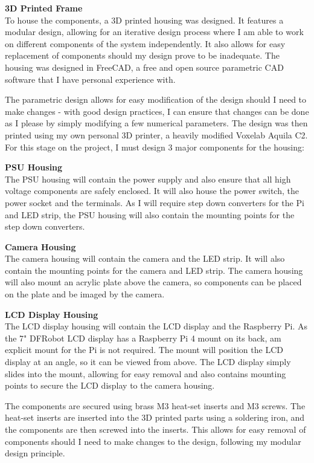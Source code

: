 \vspace{1em}
\noindent
\textbf{3D Printed Frame} \\
To house the components, a 3D printed housing was designed. It features a modular design, allowing for an iterative design process
where I am able to work on different components of the system independently. It also allows for easy replacement of components
should my design prove to be inadequate. The housing was designed in FreeCAD, a free and open source parametric CAD software 
that I have personal experience with.

The parametric design allows for easy modification of the design should I need to make changes -
with good design practices, I can ensure that changes can be done as I please by simply modifying a few numerical parameters.
The design was then printed using my own personal 3D printer, a heavily modified Voxelab Aquila C2. For this stage on the project,
I must design 3 major components for the housing:
\begin{mylist}
  \item \textbf{PSU Housing} \\
  The PSU housing will contain the power supply and also ensure that all high voltage components are safely enclosed.
  It will also house the power switch, the power socket and the terminals. As I will require step down converters for the Pi and LED strip,
  the PSU housing will also contain the mounting points for the step down converters.
  \item \textbf{Camera Housing} \\
  The camera housing will contain the camera and the LED strip. It will also contain the mounting points for the camera and LED strip.
  The camera housing will also mount an acrylic plate above the camera, so components can be placed on the plate and be imaged by the camera.
  \item \textbf{LCD Display Housing} \\
  The LCD display housing will contain the LCD display and the Raspberry Pi. As the 7" DFRobot LCD display has a Raspberry Pi 4 mount on its back,
  am explicit mount for the Pi is not required. The mount will position the LCD display at an angle, so it can be viewed from above. The LCD display
  simply slides into the mount, allowing for easy removal and also contains mounting points to secure the LCD display to the camera housing.
\end{mylist}
The components are secured using brass M3 heat-set inserts and M3 screws. The heat-set inserts are inserted into the 3D printed parts using a soldering iron,
and the components are then screwed into the inserts. This allows for easy removal of components should I need to make changes to the design, following
my modular design principle.

